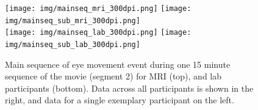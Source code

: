 \begin{figure}[h!]
  \texttt{[image: img/mainseq\_mri\_300dpi.png]}
  \texttt{[image: img/mainseq\_sub\_mri\_300dpi.png]} \\
  \texttt{[image: img/mainseq\_lab\_300dpi.png]}
  \texttt{[image: img/mainseq\_sub\_lab\_300dpi.png]} \\

  \caption{Main sequence of eye movement event during one 15 minute sequence of
  the movie (segment 2) for MRI (top), and lab participants (bottom). Data
  across all participants is shown in the right, and data for a single
  exemplary participant on the left.}

  \label{fig:overallComp}
\end{figure}

%
%
%
%
